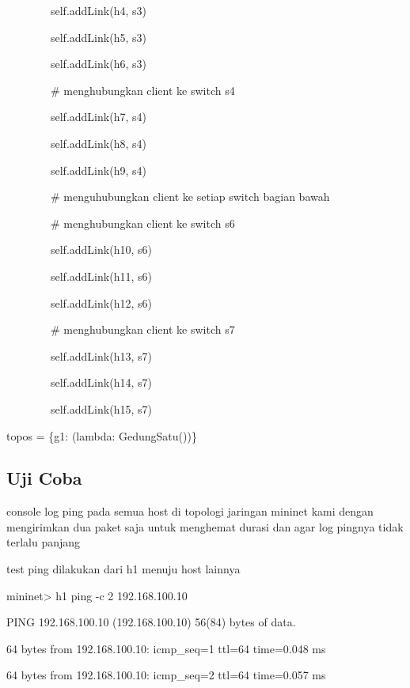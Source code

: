 \ \ \ \ \ \ \ \ self.addLink(h4, s3)

\ \ \ \ \ \ \ \ self.addLink(h5, s3)

\ \ \ \ \ \ \ \ self.addLink(h6, s3)


\bigskip

\ \ \ \ \ \ \ \ \# menghubungkan client ke switch s4

\ \ \ \ \ \ \ \ self.addLink(h7, s4)

\ \ \ \ \ \ \ \ self.addLink(h8, s4)

\ \ \ \ \ \ \ \ self.addLink(h9, s4)


\bigskip

\ \ \ \ \ \ \ \ \# menguhubungkan client ke setiap switch bagian bawah

\ \ \ \ \ \ \ \ \# menghubungkan client ke switch s6

\ \ \ \ \ \ \ \ self.addLink(h10, s6)

\ \ \ \ \ \ \ \ self.addLink(h11, s6)

\ \ \ \ \ \ \ \ self.addLink(h12, s6)


\bigskip

\ \ \ \ \ \ \ \ \# menghubungkan client ke switch s7

\ \ \ \ \ \ \ \ self.addLink(h13, s7)

\ \ \ \ \ \ \ \ self.addLink(h14, s7)

\ \ \ \ \ \ \ \ self.addLink(h15, s7)


\bigskip

topos = \{{\textquotedbl}g1{\textquotedbl}: (lambda: GedungSatu())\}


\subsection{Uji Coba}
console log ping pada semua host di topologi jaringan mininet kami dengan mengirimkan dua paket saja untuk menghemat
durasi dan agar log pingnya tidak terlalu panjang 

test ping dilakukan dari h1 menuju host lainnya

\bigskip

mininet{\textgreater} h1 ping -c 2 192.168.100.10

PING 192.168.100.10 (192.168.100.10) 56(84) bytes of data.

64 bytes from 192.168.100.10: icmp\_seq=1 ttl=64 time=0.048 ms

64 bytes from 192.168.100.10: icmp\_seq=2 ttl=64 time=0.057 ms


\bigskip


